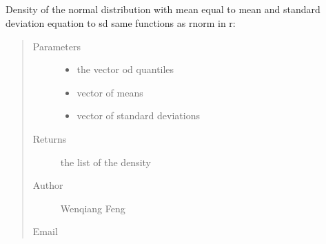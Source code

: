 \documentclass[letterpaper,12pt,english]{sphinxmanual}
\begin{document}
\subsection{}
\label{\detokenize{api:dnorm}}

\begin{fulllineitems}
\sphinxAtStartPar
Density of the normal distribution with mean
equal to mean and standard deviation equation to sd
same functions as rnorm in r: 
\begin{quote}\begin{description}
\item[{Parameters}] \leavevmode\begin{itemize}
\item {} 
\sphinxAtStartPar
{} \textendash{} the vector od quantiles

\item {} 
\sphinxAtStartPar
{} \textendash{} vector of means

\item {} 
\sphinxAtStartPar
{} \textendash{} vector of standard deviations

\end{itemize}

\item[{Returns}] \leavevmode
\sphinxAtStartPar
the list of the density

\item[{Author}] \leavevmode
\sphinxAtStartPar
Wenqiang Feng

\item[{Email}] \leavevmode
\sphinxAtStartPar
{}

\end{description}\end{quote}

\end{fulllineitems}



\subsection{}
\label{\detokenize{api:runif}}
\end{document}

